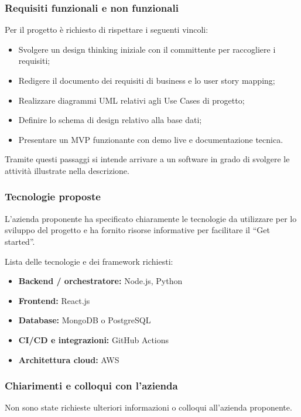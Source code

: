 \documentclass[a4paper,11pt]{article}
\begin{document}
\subsubsection{Requisiti funzionali e non funzionali}
Per il progetto è richiesto di rispettare i seguenti vincoli:

\begin{itemize}[leftmargin=*]
    \item Svolgere un design thinking iniziale con il committente per raccogliere i requisiti;
    \item Redigere il documento dei requisiti di business e lo user story mapping;
    \item Realizzare diagrammi UML relativi agli Use Cases di progetto;
    \item Definire lo schema di design relativo alla base dati;
    \item Presentare un MVP funzionante con demo live e documentazione tecnica.
\end{itemize}

Tramite questi passaggi si intende arrivare a un software in grado di svolgere le attività illustrate nella descrizione.

\subsubsection{Tecnologie proposte}

L’azienda proponente ha specificato chiaramente le tecnologie da utilizzare per lo sviluppo del progetto e ha fornito risorse informative per facilitare il ``Get started''.

Lista delle tecnologie e dei framework richiesti:

\begin{itemize}[leftmargin=*]
    \item \textbf{Backend / orchestratore:} Node.js, Python
    \item \textbf{Frontend:} React.js
    \item \textbf{Database:} MongoDB o PostgreSQL
    \item \textbf{CI/CD e integrazioni:} GitHub Actions
    \item \textbf{Architettura cloud:} AWS
\end{itemize}

\subsubsection{Chiarimenti e colloqui con l'azienda}
Non sono state richieste ulteriori informazioni o colloqui all’azienda proponente.
\end{document}
